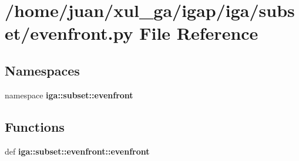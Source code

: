 \section{/home/juan/xul\_\-ga/igap/iga/subset/evenfront.py File Reference}
\label{evenfront_8py}
\subsection*{Namespaces}
\begin{CompactItemize}
\item 
namespace {\bf iga::subset::evenfront}
\end{CompactItemize}
\subsection*{Functions}
\begin{CompactItemize}
\item 
def {\bf iga::subset::evenfront::evenfront}
\end{CompactItemize}
